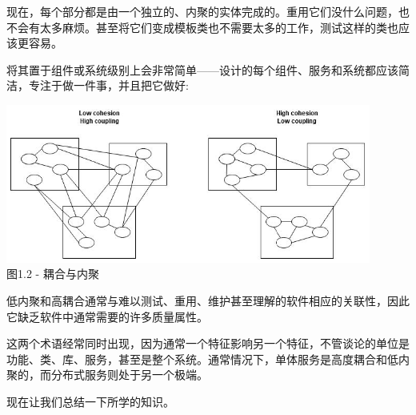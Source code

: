 现在，每个部分都是由一个独立的、内聚的实体完成的。重用它们没什么问题，也不会有太多麻烦。甚至将它们变成模板类也不需要太多的工作，测试这样的类也应该更容易。

将其置于组件或系统级别上会非常简单——设计的每个组件、服务和系统都应该简洁，专注于做一件事，并且把它做好:

\begin{center}
\includegraphics[width=0.9\textwidth]{content/1/chapter1/images/2.jpg}\\
图1.2 - 耦合与内聚
\end{center}

低内聚和高耦合通常与难以测试、重用、维护甚至理解的软件相应的关联性，因此它缺乏软件中通常需要的许多质量属性。

这两个术语经常同时出现，因为通常一个特征影响另一个特征，不管谈论的单位是功能、类、库、服务，甚至是整个系统。通常情况下，单体服务是高度耦合和低内聚的，而分布式服务则处于另一个极端。

现在让我们总结一下所学的知识。